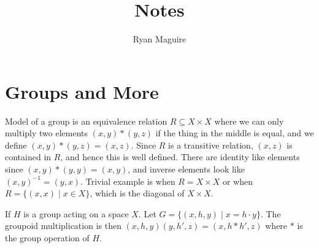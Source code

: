 \documentclass{article}                                                        %
\begin{document}
    \title{Notes}
    \author{Ryan Maguire}
    \date{\vspace{-5ex}}
    \maketitle
    \section{Groups and More}
        \begin{example}
            Model of a group is an equivalence relation $R\subseteq{X}\times{X}$
            where we can only multiply two elements $(x,y)*(y,z)$ if the thing
            in the middle is equal, and we define $(x,y)*(y,z)=(x,z)$. Since
            $R$ is a transitive relation, $(x,z)$ is contained in $R$, and hence
            this is well defined. There are identity like elements since
            $(x,y)*(y,y)=(x,y)$, and inverse elements look like
            $(x,y)^{\minus{1}}=(y,x)$. Trivial example is when $R=X\times{X}$
            or when $R=\{(x,x)\;|\;x\in{X}\}$, which is the diagonal of
            $X\times{X}$.
        \end{example}
        \begin{example}
            If $H$ is a group acting on a space $X$. Let
            $G=\{(x,h,y)\;|\;x=h\cdot{y}\}$. The groupoid multiplication is then
            $(x,h,y)(y,h',z)=(x,h*h',z)$ where $*$ is the group operation of
            $H$. 
        \end{example}
\end{document}
